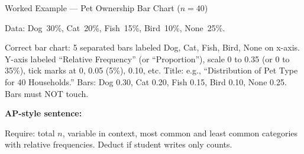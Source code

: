 \documentclass[10pt]{article}
\begin{document}
\begin{notesbox}{Worked Example --- Pet Ownership Bar Chart ($n = 40$)}
\small

\noindent Data: Dog~30\%, Cat~20\%, Fish~15\%, Bird~10\%, None~25\%.

\vspace{6pt}
\begin{teachernote}
Correct bar chart: 5 separated bars labeled Dog, Cat, Fish, Bird, None on x-axis.
Y-axis labeled ``Relative Frequency'' (or ``Proportion''), scale 0 to 0.35
(or 0 to 35\%), tick marks at 0, 0.05 (5\%), 0.10, etc.
Title: e.g., ``Distribution of Pet Type for 40 Households.''
Bars: Dog 0.30, Cat 0.20, Fish 0.15, Bird 0.10, None 0.25.
Bars must NOT touch.
\end{teachernote}

\vspace{8pt}
\textbf{AP-style sentence:}\\[4pt]

\begin{teachernote}
Require: total $n$, variable in context, most common and least common categories
with relative frequencies. Deduct if student writes only counts.
\end{teachernote}
\end{notesbox}

\newpage
\end{document}
